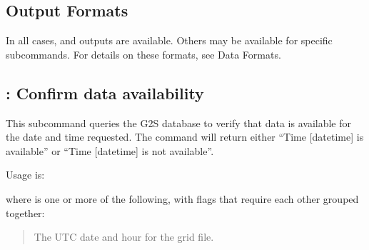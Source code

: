\documentclass[letterpaper,10pt,english]{sphinxmanual}
\begin{document}
\subsection{Output Formats}
\label{\detokenize{userguide:output-formats}}
\sphinxAtStartPar
In all cases,  and  outputs are available.  Others may be available for specific subcommands.  For details on these formats, see Data Formats.


\subsection{: Confirm data availability}
\label{\detokenize{userguide:checktime-confirm-data-availability}}
\sphinxAtStartPar
This subcommand queries the G2S database to verify that data is available for the date and time requested.  The command will return either “Time {[}datetime{]} is available” or “Time {[}datetime{]} is not available”.

\sphinxAtStartPar
Usage is:

\sphinxAtStartPar
{}

\sphinxAtStartPar
where \sphinxcode{\sphinxupquote{{[}flags{]}}} is one or more of the following, with flags that require each other grouped together:

\sphinxAtStartPar
{}
\begin{quote}

\sphinxAtStartPar
The UTC date and hour for the grid file.
\end{quote}
\begin{description}
\sphinxAtStartPar
{}

\sphinxAtStartPar
{}

\end{description}
\end{document}
